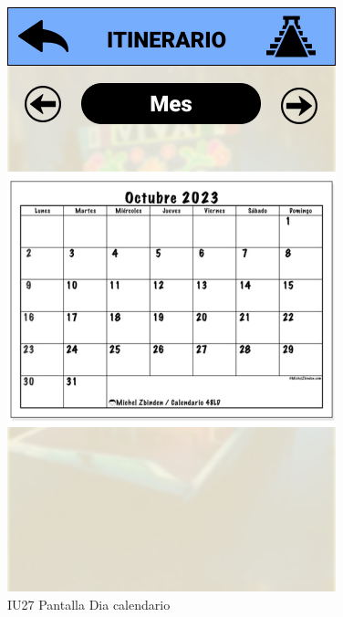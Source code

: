 \begin{figure}[h]
    \begin{minipage}{0.5\textwidth}
        \centering
        \includegraphics[width=.7\linewidth]{Pantallas Prototipo3/IU27 Pantalla Dia calendario.jpg}
        \caption{IU27 Pantalla Dia calendario}
    \end{minipage}
    

\end{figure}
